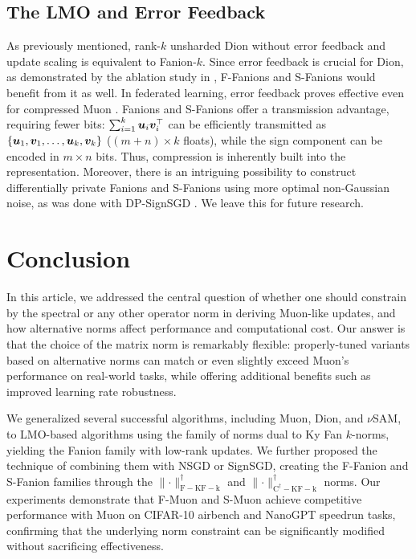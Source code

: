 \documentclass[pmlr]{jmlr}%
\newcommand{\norm}[1]{\lVert #1\rVert}
\begin{document}
 \subsection{The LMO and Error Feedback}
 
 As previously mentioned, rank-$k$ unsharded Dion without error feedback and update scaling is equivalent to Fanion-$k$. Since error feedback is crucial for Dion, as demonstrated by the ablation study in \citep{ahn2025dion}, F-Fanions and S-Fanions would benefit from it as well. In federated learning, error feedback proves effective even for compressed Muon \citep{gruntkowska2025efmuon}. Fanions and S-Fanions offer a transmission advantage, requiring fewer bits: $\sum_{i=1}^k {\bm{u}}_i {\bm{v}}_i^\top$ can be efficiently transmitted as $\{{\bm{u}}_1, {\bm{v}}_1, \dots, {\bm{u}}_k, {\bm{v}}_k\}$ ($(m+n)\times k$ floats), while the sign component can be encoded in $m \times n$ bits. Thus, compression is inherently built into the representation. Moreover, there is an intriguing possibility to construct differentially private Fanions and S-Fanions using more optimal non-Gaussian noise, as was done with DP-SignSGD \citep{jang2024dplogsign}. We leave this for future research.
 
 
 \section{Conclusion}
 
 In this article, we addressed the central question of whether one should constrain by the spectral or any other operator norm in deriving Muon-like updates, and how alternative norms affect performance and computational cost. Our answer is that the choice of the matrix norm is remarkably flexible: properly-tuned variants based on alternative norms can match or even slightly exceed Muon's performance on real-world tasks, while offering additional benefits such as improved learning rate robustness.
 
 We generalized several successful algorithms, including Muon, Dion, and $\nu$SAM, to LMO-based algorithms using the family of norms dual to Ky Fan $k$-norms, yielding the Fanion family with low-rank updates. We further proposed the technique of combining them with NSGD or SignSGD, creating the F-Fanion and S-Fanion families through the $\norm{\cdot}_{\mathrm{F-KF-k}}^\dagger$ and $\norm{\cdot}_{\mathrm{C^\dagger-KF-k}}^\dagger$ norms. Our experiments demonstrate that F-Muon and S-Muon achieve competitive performance with Muon on CIFAR-10 airbench and NanoGPT speedrun tasks, confirming that the underlying norm constraint can be significantly modified without sacrificing effectiveness.
 
\end{document}
